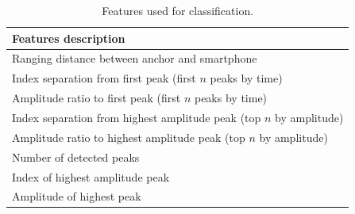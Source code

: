 \documentclass[sigconf]{acmart}
\newcommand{\vp}{\vspace{-1.5em}}
\begin{document}
\begin{table}[]
\caption{Features used for classification.}
\label{tab:CIR_features}
\vp\small
\setlength\tabcolsep{1.8pt}
\begin{tabular}{|l|}
\hline
\textbf{Features description}                                      \\ \hline
Ranging distance between anchor and smartphone                    \\ \hline
Index separation from first peak (first $n$ peaks by time)        \\ \hline
Amplitude ratio to first peak (first $n$ peaks by time)           \\ \hline
Index separation from highest amplitude peak (top $n$ by amplitude) \\ \hline
Amplitude ratio to highest amplitude peak (top $n$ by amplitude)  \\ \hline
Number of detected peaks                                          \\ \hline
Index of highest amplitude peak                                   \\ \hline
Amplitude of highest peak                                         \\ \hline
\end{tabular}
\vspace{-15pt}
\end{table}
\end{document}
